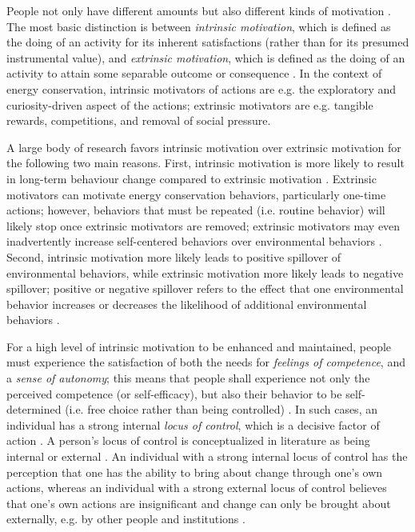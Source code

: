 \documentclass[a4paper,10pt]{article}
\begin{document}
People not only have different amounts but also different kinds of motivation \citep{Ryan2000}. The most basic distinction is between \textit{intrinsic motivation}, which is defined as the doing of an activity for its inherent satisfactions (rather than for its presumed instrumental value), and \textit{extrinsic motivation}, which is defined as the doing of an activity to attain some separable outcome or consequence \citep{Ryan2000}. In the context of energy conservation, intrinsic motivators of actions are e.g. the exploratory and curiosity-driven aspect of the actions; extrinsic motivators are e.g. tangible rewards, competitions, and removal of social pressure. 

A large body of research favors intrinsic motivation over extrinsic motivation for the following two main reasons. First, intrinsic motivation is more likely to result in long-term behaviour change compared to extrinsic motivation \citep{He2010}. Extrinsic motivators can motivate energy conservation behaviors, particularly one-time actions; however, behaviors that must be repeated (i.e. routine behavior) will likely stop once extrinsic motivators are removed; extrinsic motivators may even inadvertently increase self-centered behaviors over environmental behaviors \citep{Abrahamse2013,Swim2014}. Second, intrinsic motivation more likely leads to positive spillover of environmental behaviors, while extrinsic motivation more likely leads to negative spillover; positive or negative spillover refers to the effect that one environmental behavior increases or decreases the likelihood of additional environmental behaviors \citep{thogersen2009simple,Truelove2014,Knowles2014}.

For a high level of intrinsic motivation to be enhanced and maintained, people must experience the satisfaction of both the needs for \textit{feelings of competence}, and a  \textit{sense of autonomy}; this means that people shall experience not only the perceived 
competence (or self-efficacy), but also their behavior to be self-determined (i.e. free choice rather than being controlled) \citep{Ryan2000}. In such cases, an individual has a strong internal \textit{locus of control}, which is a decisive factor of action \citep{Kollmuss2002}. A person's locus of control is conceptualized in literature as being internal or external \citep{Rotter1966}. An individual with a strong internal locus of control has the perception that one has the ability to bring about change through one's own actions, whereas an individual with a strong external locus of control believes that one's own actions are insignificant and change can only be brought about externally, e.g. by other people and institutions \citep{Rotter1966}. 
\end{document}
